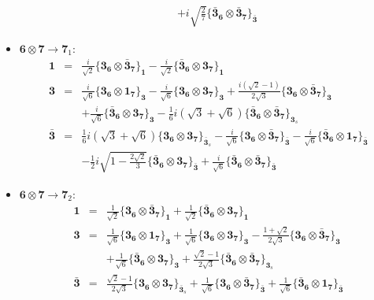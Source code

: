 \documentclass[english]{article}
\newcommand{\subcg}[3]{\big\{ {#1}\otimes{#2}\big\}^{}_{#3}}
\newcommand{\rep}[1]{\mathbf{#1}}
\begin{document}
\begin{itemize}
\begin{eqnarray*}
 & & +i \sqrt{\frac{2}{7}}\subcg{\rep{\bar{3}}_{\rep{6}}}{\rep{\bar{3}}_{\rep{7}}}{\rep{\bar{3}}}
\end{eqnarray*}
\item $\rep{6}\otimes\rep{7}\to\rep{7}_{1}$:
\begin{eqnarray*}
\rep{1} &=& \frac{i}{\sqrt{2}}\subcg{\rep{3}_{\rep{6}}}{\rep{\bar{3}}_{\rep{7}}}{\rep{1}}-\frac{i}{\sqrt{2}}\subcg{\rep{\bar{3}}_{\rep{6}}}{\rep{3}_{\rep{7}}}{\rep{1}}
\\
\rep{3} &=& \frac{i}{\sqrt{6}}\subcg{\rep{3}_{\rep{6}}}{\rep{1}_{\rep{7}}}{\rep{3}}-\frac{i}{\sqrt{6}}\subcg{\rep{3}_{\rep{6}}}{\rep{3}_{\rep{7}}}{\rep{3}}+\frac{i \left(\sqrt{2}-1\right)}{2 \sqrt{3}}\subcg{\rep{3}_{\rep{6}}}{\rep{\bar{3}}_{\rep{7}}}{\rep{3}} \\ 
 & & +\frac{i}{\sqrt{6}}\subcg{\rep{\bar{3}}_{\rep{6}}}{\rep{3}_{\rep{7}}}{\rep{3}}-\frac{1}{6} i \left(\sqrt{3}+\sqrt{6}\right)\subcg{\rep{\bar{3}}_{\rep{6}}}{\rep{\bar{3}}_{\rep{7}}}{\rep{3}_{s}}
\\
\rep{\bar{3}} &=& \frac{1}{6} i \left(\sqrt{3}+\sqrt{6}\right)\subcg{\rep{3}_{\rep{6}}}{\rep{3}_{\rep{7}}}{\rep{\bar{3}}_{s}}-\frac{i}{\sqrt{6}}\subcg{\rep{3}_{\rep{6}}}{\rep{\bar{3}}_{\rep{7}}}{\rep{\bar{3}}}-\frac{i}{\sqrt{6}}\subcg{\rep{\bar{3}}_{\rep{6}}}{\rep{1}_{\rep{7}}}{\rep{\bar{3}}} \\ 
 & & -\frac{1}{2} i \sqrt{1-\frac{2 \sqrt{2}}{3}}\subcg{\rep{\bar{3}}_{\rep{6}}}{\rep{3}_{\rep{7}}}{\rep{\bar{3}}}+\frac{i}{\sqrt{6}}\subcg{\rep{\bar{3}}_{\rep{6}}}{\rep{\bar{3}}_{\rep{7}}}{\rep{\bar{3}}}
\end{eqnarray*}
\item $\rep{6}\otimes\rep{7}\to\rep{7}_{2}$:
\begin{eqnarray*}
\rep{1} &=& \frac{1}{\sqrt{2}}\subcg{\rep{3}_{\rep{6}}}{\rep{\bar{3}}_{\rep{7}}}{\rep{1}}+\frac{1}{\sqrt{2}}\subcg{\rep{\bar{3}}_{\rep{6}}}{\rep{3}_{\rep{7}}}{\rep{1}}
\\
\rep{3} &=& \frac{1}{\sqrt{6}}\subcg{\rep{3}_{\rep{6}}}{\rep{1}_{\rep{7}}}{\rep{3}}+\frac{1}{\sqrt{6}}\subcg{\rep{3}_{\rep{6}}}{\rep{3}_{\rep{7}}}{\rep{3}}-\frac{1+\sqrt{2}}{2 \sqrt{3}}\subcg{\rep{3}_{\rep{6}}}{\rep{\bar{3}}_{\rep{7}}}{\rep{3}} \\ 
 & & +\frac{1}{\sqrt{6}}\subcg{\rep{\bar{3}}_{\rep{6}}}{\rep{3}_{\rep{7}}}{\rep{3}}+\frac{\sqrt{2}-1}{2 \sqrt{3}}\subcg{\rep{\bar{3}}_{\rep{6}}}{\rep{\bar{3}}_{\rep{7}}}{\rep{3}_{s}}
\\
\rep{\bar{3}} &=& \frac{\sqrt{2}-1}{2 \sqrt{3}}\subcg{\rep{3}_{\rep{6}}}{\rep{3}_{\rep{7}}}{\rep{\bar{3}}_{s}}+\frac{1}{\sqrt{6}}\subcg{\rep{3}_{\rep{6}}}{\rep{\bar{3}}_{\rep{7}}}{\rep{\bar{3}}}+\frac{1}{\sqrt{6}}\subcg{\rep{\bar{3}}_{\rep{6}}}{\rep{1}_{\rep{7}}}{\rep{\bar{3}}} \\ 

\end{eqnarray*}
\end{itemize}
\end{document}
